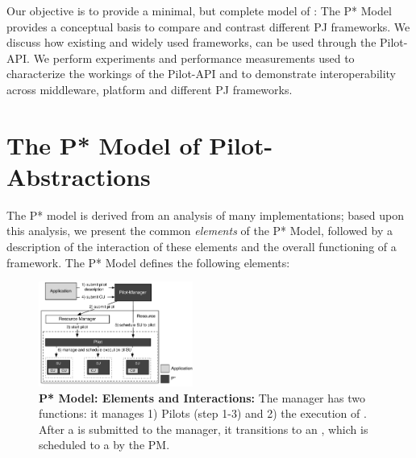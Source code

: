 \documentclass{sig-alternate}
\begin{document}
Our objective is to provide a minimal, but complete model of
\pilotjobs: The P* Model provides a conceptual basis to compare and
contrast different PJ frameworks.  We discuss how existing and widely
used \pilotjob frameworks, can be used through the Pilot-API. We
perform experiments and performance measurements used to characterize
the workings of the Pilot-API and to demonstrate interoperability
across middleware, platform and different PJ frameworks.










\section{The P* Model of Pilot-\\Abstractions}
\label{sec:pilot-model}

The P* model is derived from an analysis of many \pilotjob implementations;
based upon this analysis, we present the common {\it elements} of the P*
Model, followed by a description of the interaction of these elements and the
overall functioning of a \pilotjob framework. The P* Model defines the
following elements:

\begin{figure}[t]
	\upp\upp
    \centering
    \includegraphics[width=0.45\textwidth]{figures/pstar_model_single.pdf}
    \caption{ \textbf{P* Model: Elements and
        Interactions:} The manager has two functions: it manages 1)
      Pilots (step 1-3) and 2) the execution of \cus. After a \cu is
      submitted to the manager, it transitions to an \su, which is
      scheduled to a \pilot by the PM.}
	\upp\upp
    \label{fig:figures_pstar}
\end{figure}
\end{document}
